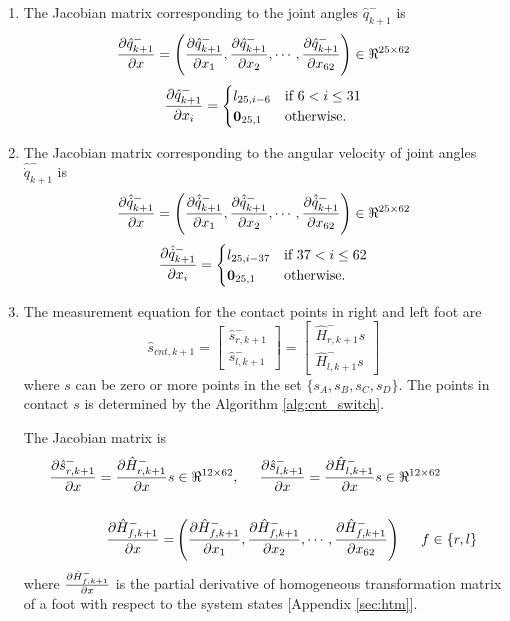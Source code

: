 \begin{enumerate}
\item The Jacobian matrix corresponding to the joint angles $\hat{q}_{k+1}^-$ is
\begin{equation}
\label{eq:dq_msrdx}
\frac{\partial {\hat{q}_{k+1}^-}}{\partial {x}} = \left(\frac{\partial {\hat{q}_{k+1}^-}}{\partial {x_{1}}}, \frac{\partial {\hat{q}_{k+1}^-}}{\partial {x_{2}}}, \cdots , \frac{\partial {\hat{q}_{k+1}^-}}{\partial {x_{62}}}\right) \in \Re^{25 \times 62}
\end{equation}
 \[
 \frac{\partial {\hat{q}_{k+1}^-}}{\partial {x_{i}}} =
 \begin{cases}
 l_{25,i-6} & \text{if } 6 < i \leq 31 \\
 \textbf{0}_{25,1} & \text{otherwise}.
 \end{cases}
 \]

\item The Jacobian matrix corresponding to the angular velocity of joint angles  $\hat{\dot{q}}_{k+1}^-$ is 
\begin{equation}
 \label{eq:ddq_msrdx}
\frac{\partial {\hat{\dot{q}}_{k+1}^-}}{\partial {x}} = \left(\frac{\partial {\hat{\dot{q}}_{k+1}^-}}{\partial {x_{1}}}, \frac{\partial {\hat{\dot{q}}_{k+1}^-}}{\partial {x_{2}}}, \cdots , \frac{\partial {\hat{\dot{q}}_{k+1}^-}}{\partial {x_{62}}}\right) \in \Re^{25 \times 62}
\end{equation}
  \[
 \frac{\partial {\hat{\dot{q}}_{k+1}^-}}{\partial {x_{i}}} =
 \begin{cases}
 l_{25,i-37} & \text{if } 37 < i \leq 62 \\
 \textbf{0}_{25,1} & \text{otherwise}.
 \end{cases}
 \]

 \item The measurement equation for the contact points in right and left foot are 
 $$ \hat{s}_{cnt,k+1}=
 \begin{bmatrix}
 \hat{s}_{r,k+1}^- \\ \hat{s}_{l,k+1}^-
 \end{bmatrix} 
 = \begin{bmatrix}
 \hat{H}_{r,k+1}^- s  \\ \hat{H}_{l,k+1}^- s
   \end{bmatrix}
	$$ 
where $s$ can be zero or more points in the set $ \lbrace s_A,s_B,s_C,s_D \rbrace$. The points in contact $s$ is determined by the Algorithm \ref{alg:cnt_switch}. 

 The Jacobian matrix is 
\begin{equation}
    \label{eq:dscnt_msrdx}
    \begin{split}
   \dfdx{\hat{s}_{r,k+1}^-}{x} = \dfdx{\hat{H}_{r,k+1}^-}{x}s &\in \Re^{12 \times 62}, \hspace{5mm}  \dfdx{\hat{s}_{l,k+1}^-}{x} = \dfdx{\hat{H}_{l,k+1}^-}{x}s\in \Re^{12 \times 62}
 \\ \vspace{1cm} \\
     \dfdx{\hat{H}_{f,k+1}^-}{x} = &\left( \dfdx{\hat{H}_{f,k+1}^-}{x_1}, \dfdx{\hat{H}_{f,k+1}^-}{x_2},\cdots, \dfdx{\hat{H}_{f,k+1}^-}{x_{62}} \right) \hspace{5mm} f \in \{r,l\}
     \end{split}
\end{equation}
where $\frac{\partial {\hat{H}_{f,k+1}^-}}{\partial {x}}$ is the partial derivative of homogeneous transformation matrix of a foot with respect to the system states [Appendix \ref{sec:htm}].
\end{enumerate}
